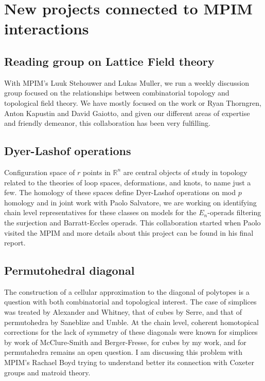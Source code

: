 \documentclass{amsart}
\theoremstyle{definition}
\begin{document}
	\section{New projects connected to MPIM interactions}

	\subsection{Reading group on Lattice Field theory}
	With MPIM's Luuk Stehouwer and Lukas Muller, we run a weekly discussion group focused on the relationships between combinatorial topology and topological field theory.
	We have mostly focused on the work or Ryan Thorngren, Anton Kapustin and David Gaiotto, and given our different areas of expertise and friendly demeanor, this collaboration has been very fulfilling.

	\subsection{Dyer-Lashof operations}
	Configuration space of $r$ points in $\mathbb R^n$ are central objects of study in topology related to the theories of loop spaces, deformations, and knots, to name just a few.
	The homology of these spaces define Dyer-Lashof operations on mod $p$ homology and in joint work with Paolo Salvatore, we are working on identifying chain level representatives for these classes on models for the $E_n$-operads filtering the surjection and Barratt-Eccles operads.
	This collaboration started when Paolo visited the MPIM and more details about this project can be found in his final report.

	\subsection{Permutohedral diagonal}
	The construction of a cellular approximation to the diagonal of polytopes is a question with both combinatorial and topological interest.
	The case of simplices was treated by Alexander and Whitney, that of cubes by Serre, and that of permutohedra by Saneblize and Umble.
	At the chain level, coherent homotopical corrections for the lack of symmetry of these diagonals were known for simplices by work of McClure-Smith and Berger-Fresse, for cubes by my work, and for permutahedra remains an open question.
	I am discussing this problem with MPIM's Rachael Boyd trying to understand better its connection with Coxeter groups and matroid theory.
\end{document}
